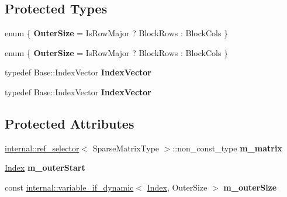 \subsection*{Protected Types}
\begin{DoxyCompactItemize}
\item 
\mbox{\label{class_eigen_1_1internal_1_1sparse__matrix__block__impl_a0001a97a21a4527594ebca6992e2faa3}} 
enum \{ {\bfseries Outer\+Size} = Is\+Row\+Major ? Block\+Rows \+: Block\+Cols
 \}
\item 
\mbox{\label{class_eigen_1_1internal_1_1sparse__matrix__block__impl_a3d7c29dfb8a25ab37d0616bf2f44a0ad}} 
enum \{ {\bfseries Outer\+Size} = Is\+Row\+Major ? Block\+Rows \+: Block\+Cols
 \}
\item 
\mbox{\label{class_eigen_1_1internal_1_1sparse__matrix__block__impl_aa336897cd666b1c976550a1b72258b0c}} 
typedef Base\+::\+Index\+Vector {\bfseries Index\+Vector}
\item 
\mbox{\label{class_eigen_1_1internal_1_1sparse__matrix__block__impl_aa336897cd666b1c976550a1b72258b0c}} 
typedef Base\+::\+Index\+Vector {\bfseries Index\+Vector}
\end{DoxyCompactItemize}
\subsection*{Protected Attributes}
\begin{DoxyCompactItemize}
\item 
\mbox{\label{class_eigen_1_1internal_1_1sparse__matrix__block__impl_acb6e2b645110167f18b7cc44deeb3b54}} 
\hyperlink{struct_eigen_1_1internal_1_1ref__selector}{internal\+::ref\+\_\+selector}$<$ Sparse\+Matrix\+Type $>$\+::non\+\_\+const\+\_\+type {\bfseries m\+\_\+matrix}
\item 
\mbox{\label{class_eigen_1_1internal_1_1sparse__matrix__block__impl_ae40d81f5f65429e5dfff1cbaf7aa99bc}} 
\hyperlink{group___core___module_a554f30542cc2316add4b1ea0a492ff02}{Index} {\bfseries m\+\_\+outer\+Start}
\item 
\mbox{\label{class_eigen_1_1internal_1_1sparse__matrix__block__impl_a78182faa37344a9a9b476bfb627688bd}} 
const \hyperlink{class_eigen_1_1internal_1_1variable__if__dynamic}{internal\+::variable\+\_\+if\+\_\+dynamic}$<$ \hyperlink{group___core___module_a554f30542cc2316add4b1ea0a492ff02}{Index}, Outer\+Size $>$ {\bfseries m\+\_\+outer\+Size}
\end{DoxyCompactItemize}
